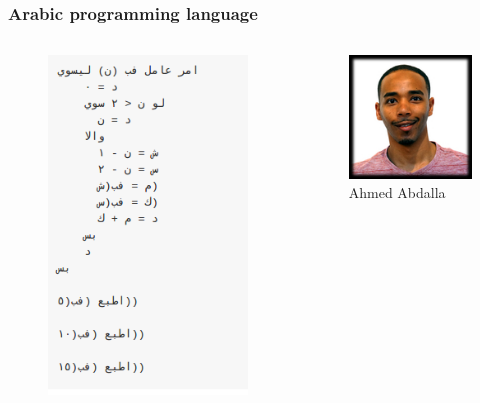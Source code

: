 \documentclass{beamer}
\theoremstyle{mystyle}
\begin{document}
\begin{frame}

\frametitle{Arabic programming language}
\begin{center}

\begin{columns}
		\begin{figure}
			\vspace{0.1in}
			\includegraphics[scale=0.43]{ahmazing.png}
		\end{figure}
		\begin{figure}
			\includegraphics[scale=0.009]{ahmed.jpg}
			\caption{Ahmed Abdalla}
		\end{figure}
\end{columns}


\end{center}
\end{frame}

\end{document}
